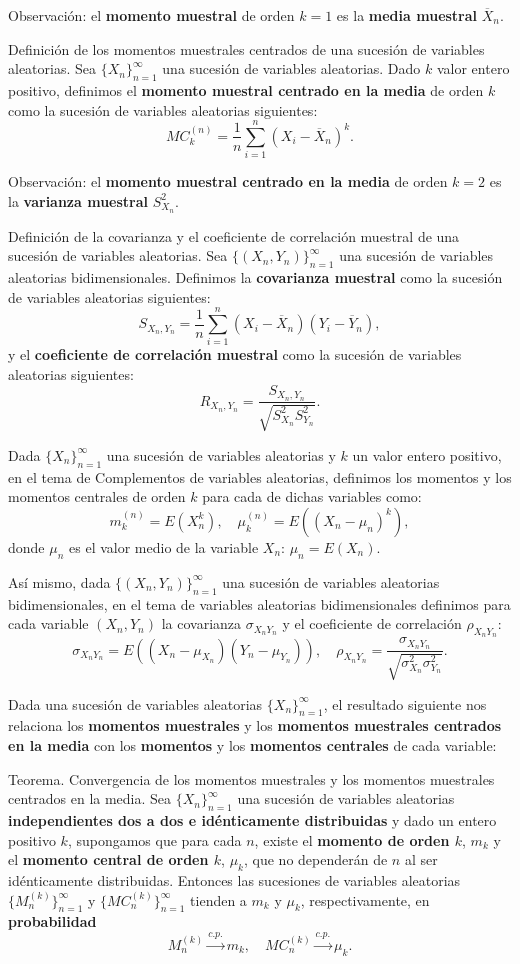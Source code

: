\documentclass[]{book}
\begin{document}
 Observación:
el \textbf{momento muestral} de orden \(k=1\) es la \textbf{media muestral} \(\overline{X}_n\).

 Definición de los momentos muestrales centrados de una sucesión de variables aleatorias.
Sea \(\{X_n\}_{n=1}^\infty\) una sucesión de variables aleatorias. Dado \(k\) valor entero positivo, definimos el \textbf{momento muestral centrado en la media} de orden \(k\) como la sucesión de variables aleatorias siguientes:
\[
MC_k^{(n)} = \frac{1}{n}\sum_{i=1}^n (X_i-\overline{X}_n)^k.
\]

 Observación:
el \textbf{momento muestral centrado en la media} de orden \(k=2\) es la \textbf{varianza muestral} \(S_{X_n}^2\).

 Definición de la covarianza y el coeficiente de correlación muestral de una sucesión de variables aleatorias.
Sea \(\{(X_n,Y_n)\}_{n=1}^\infty\) una sucesión de variables aleatorias bidimensionales. Definimos la \textbf{covarianza muestral} como la sucesión de variables aleatorias siguientes:
\[
S_{X_n,Y_n} = \frac{1}{n}\sum_{i=1}^n (X_i-\overline{X}_n)(Y_i-\overline{Y}_n),
\]
y el \textbf{coeficiente de correlación muestral} como la sucesión de variables aleatorias siguientes:
\[
R_{X_n,Y_n}=\frac{S_{X_n,Y_n}}{\sqrt{S_{X_n}^2 S_{Y_n}^2}}.
\]

Dada \(\{X_n\}_{n=1}^\infty\) una sucesión de variables aleatorias y \(k\) un valor entero positivo, en el tema de Complementos de variables aleatorias, definimos los momentos y los momentos centrales de orden \(k\) para cada de dichas variables como:
\[
m_k^{(n)} = E\left(X_n^k\right),\quad\mu_k^{(n)}=E\left(\left(X_n-\mu_n\right)^k\right),
\]
donde \(\mu_n\) es el valor medio de la variable \(X_n\): \(\mu_n = E(X_n)\).

Así mismo, dada \(\{(X_n,Y_n)\}_{n=1}^\infty\) una sucesión de variables aleatorias bidimensionales, en el tema de variables aleatorias bidimensionales definimos para cada variable \((X_n,Y_n)\) la covarianza \(\sigma_{X_nY_n}\) y el coeficiente de correlación \(\rho_{X_nY_n}\):
\[
\sigma_{X_nY_n}=E((X_n-\mu_{X_n})(Y_n-\mu_{Y_n})),\quad \rho_{X_nY_n}=\frac{\sigma_{X_nY_n}}{\sqrt{\sigma_{X_n}^2\sigma_{Y_n}^2}}.
\]

Dada una sucesión de variables aleatorias \(\{X_n\}_{n=1}^\infty\), el resultado siguiente nos relaciona los \textbf{momentos muestrales} y los \textbf{momentos muestrales centrados en la media} con los \textbf{momentos} y los \textbf{momentos centrales} de cada variable:

 Teorema. Convergencia de los momentos muestrales y los momentos muestrales centrados en la media.
Sea \(\{X_n\}_{n=1}^\infty\) una sucesión de variables aleatorias \textbf{independientes dos a dos e idénticamente distribuidas} y dado un entero positivo \(k\), supongamos que para cada \(n\), existe el \textbf{momento de orden \(k\)}, \(m_k\) y el \textbf{momento central de orden \(k\)}, \(\mu_k\), que no dependerán de \(n\) al ser idénticamente distribuidas. Entonces las sucesiones de variables aleatorias \(\{M_n^{(k)}\}_{n=1}^\infty\) y \(\{MC_n^{(k)}\}_{n=1}^\infty\) tienden a \(m_k\) y \(\mu_k\), respectivamente, en \textbf{probabilidad}
\[
M_n^{(k)}\stackrel{c.p.}{\longrightarrow} m_k,\quad MC_n^{(k)}\stackrel{c.p.}{\longrightarrow} \mu_k.
\]
\end{document}

